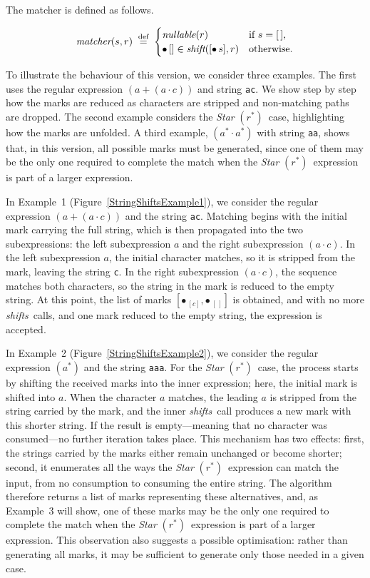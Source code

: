 \documentclass[12pt]{article}
\newcommand{\dn}{\ensuremath{\stackrel{\mbox{\scriptsize def}}{=}}}
\newcommand{\shift}{\textit{shift}}
\newcommand{\shifts}{\textit{shifts}}
\newcommand{\Marked}[1]{\bullet\,#1}
\newcommand{\nullable}{\textit{nullable}}
\newcommand{\STARText}{\textit{Star} $(r^*)$}
\newcommand{\emptylist}{[\,]}
\newcommand{\matcher}{\textit{matcher}}
\begin{document}
The matcher is defined as follows.

\[
\matcher(s, r) \; \dn\;
  \begin{cases}
    \nullable(r) & \text{if $s = \emptylist$}, \\
    \Marked{[]} \in \shift([\Marked{s}], r) & \text{otherwise.}
  \end{cases}
\]

To illustrate the behaviour of this version, we consider three examples. The first uses the
regular expression $(a + (a \cdot c))$ and string \texttt{ac}. We show step by step how the
marks are reduced as characters are stripped and non-matching paths are dropped. The second
example considers the \STARText\ case, highlighting how the marks are unfolded. A third
example, $(a^* \cdot a^*)$ with string \texttt{aa}, shows that, in this version, all possible
marks must be generated, since one of them may be the only one required to complete the match
when the \STARText\ expression is part of a larger expression.
 
In Example~1 (Figure~\ref{StringShiftsExample1}), we consider the regular expression
$(a + (a \cdot c))$ and the string \texttt{ac}. Matching begins with the initial mark carrying
the full string, which is then propagated into the two subexpressions: the left subexpression
$a$ and the right subexpression $(a \cdot c)$. In the left subexpression $a$, the initial
character matches, so it is stripped from the mark, leaving the string \texttt{c}. In the
right subexpression $(a \cdot c)$, the sequence matches both characters, so the string in the
mark is reduced to the empty string. At this point, the list of marks $[\Marked{_{[c]}},
\Marked{_{\emptylist}}]$ is obtained, and with no more \shifts\, calls, and one mark reduced to the empty string, the
expression is accepted.

In Example~2 (Figure~\ref{StringShiftsExample2}), we consider the regular expression $(a^*)$ and the
string \texttt{aaa}. For the \STARText\ case, the process starts by shifting the received marks into
the inner expression; here, the initial mark is shifted into $a$. When the character $a$ matches,
the leading $a$ is stripped from the string carried by the mark, and the inner \shifts\ call
produces a new mark with this shorter string. If the result is empty—meaning that no character was
consumed—no further iteration takes place. This mechanism has two effects: first, the strings
carried by the marks either remain unchanged or become shorter; second, it enumerates all the ways
the \STARText\ expression can match the input, from no consumption to consuming the entire string.
The algorithm therefore returns a list of marks representing these alternatives, and, as
Example~3 will show, one of these marks may be the only one required to complete the match when
the \STARText\ expression is part of a larger expression. This observation also suggests a possible
optimisation: rather than generating all marks, it may be sufficient to generate only those needed
in a given case.
\end{document}
